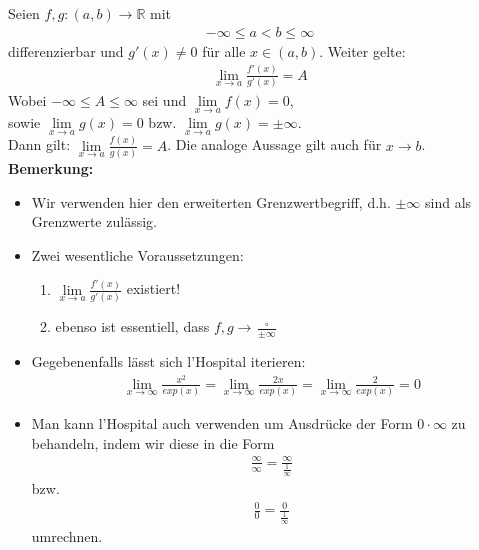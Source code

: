 \begin{Satz}{
	Seien $f,g: (a,b) \rightarrow \mathbb{R}$ mit
	\begin{align*}
		-\infty \leq a < b \leq \infty
	\end{align*}		
	differenzierbar und $g'(x) \neq 0$ für alle $x \in (a,b)$. Weiter gelte:
	\begin{align*}
		\lim\limits_{x \rightarrow a}{\frac{f'(x)}{g'(x)} } = A
	\end{align*}
	Wobei  $ -\infty \leq A \leq \infty$ sei und 
	$\lim\limits_{x \rightarrow a}{f(x) = 0}$, \\ 
	sowie 
	$\lim\limits_{x \rightarrow a}{g(x) = 0} $
	bzw. $\lim\limits_{x\rightarrow a}{g(x) = \pm \infty}$.\\
	Dann gilt: $\lim\limits_{x \rightarrow a}{\frac{f(x)}{g(x)} = A}$.
	Die analoge Aussage gilt auch für $x \rightarrow b$.\\
	\textbf{Bemerkung:}
	\begin{itemize}
		\item Wir verwenden hier den erweiterten Grenzwertbegriff, d.h. $\pm \infty$ 
		sind als Grenzwerte zulässig.
		\item Zwei wesentliche Voraussetzungen:
			\begin{enumerate}
				\item $\lim\limits_{x \rightarrow a}
				{\frac{f'(x)}{g'(x)}}$ existiert!
				\item ebenso ist essentiell, dass $f,g \rightarrow 
				\frac{\circ }{\pm \infty}$
			\end{enumerate}
		\item Gegebenenfalls lässt sich l'Hospital iterieren:
		\begin{align*}
			\lim\limits_{x \rightarrow \infty}{\frac{x^2}{exp(x)}} = 
			\lim\limits_{x \rightarrow \infty}{\frac{2x}{exp(x)}} = 
			\lim\limits_{x \rightarrow \infty}{\frac{2}{exp(x)}} = 0
		\end{align*}
		\item Man kann l'Hospital auch verwenden um Ausdrücke der Form 
		$0 \cdot \infty$ zu behandeln, indem wir diese in die Form
		\begin{align*}
		 	\frac{\infty}{\infty} = \frac{\infty}{\frac{1}{\infty}}
		\end{align*}
		bzw. 
		\begin{align*}
			\frac{0}{0} = \frac{0}{\frac{1}{\infty}}
		\end{align*}
		umrechnen.
	\end{itemize}
	
}
\end{Satz}
